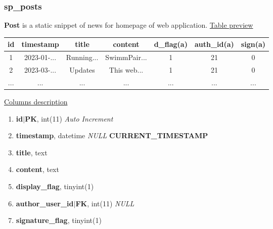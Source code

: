 \subsubsection*{sp\_posts}
\textbf{Post} is a static snippet of news for homepage of web application.
\newline
\underline{Table preview}
\begin{center}
  \begin{tabular}{||c c c c c c c||} 
  \hline
  id & timestamp & title & content & d\_flag(a) & auth\_id(a) & sign(a)  \\ [0.5ex] 
  \hline\hline
  1 & 2023-01-... & Running... & SwimmPair... & 1 & 21 & 0 \\ 
  \hline
  2 & 2023-03-...  & Updates & This web... & 1 & 21 & 0 \\ 
 \hline
  ... & ... & ... & ... & ... & ...  & ... \\ [0.5ex] 
  \hline
  \end{tabular}
\end{center}
\underline{Columns description}
\begin{enumerate}
  \setlength\itemsep{0em}
  \item \textbf{id$|$PK}, int(11) \textit{Auto Increment}
  \item \textbf{timestamp}, datetime \textit{NULL} \lbrack \textbf{CURRENT\_TIMESTAMP}\rbrack 
  \item \textbf{title}, text
  \item \textbf{content}, text
  \item \textbf{display\_flag}, tinyint(1)
  \item \textbf{author\_user\_id$|$FK}, int(11) \textit{NULL}
  \item \textbf{signature\_flag}, tinyint(1)
\end{enumerate}

